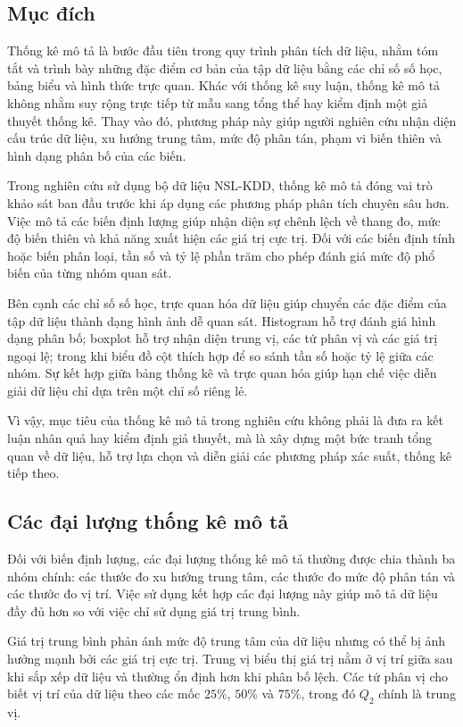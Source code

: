\documentclass[../main.tex]{subfiles}
\begin{document}
\subsection{Mục đích}

Thống kê mô tả là bước đầu tiên trong quy trình phân tích dữ liệu, nhằm tóm tắt và trình bày những đặc điểm cơ bản của tập dữ liệu bằng các chỉ số số học, bảng biểu và hình thức trực quan. Khác với thống kê suy luận, thống kê mô tả không nhằm suy rộng trực tiếp từ mẫu sang tổng thể hay kiểm định một giả thuyết thống kê. Thay vào đó, phương pháp này giúp người nghiên cứu nhận diện cấu trúc dữ liệu, xu hướng trung tâm, mức độ phân tán, phạm vi biến thiên và hình dạng phân bố của các biến.

Trong nghiên cứu sử dụng bộ dữ liệu NSL-KDD, thống kê mô tả đóng vai trò khảo sát ban đầu trước khi áp dụng các phương pháp phân tích chuyên sâu hơn. Việc mô tả các biến định lượng giúp nhận diện sự chênh lệch về thang đo, mức độ biến thiên và khả năng xuất hiện các giá trị cực trị. Đối với các biến định tính hoặc biến phân loại, tần số và tỷ lệ phần trăm cho phép đánh giá mức độ phổ biến của từng nhóm quan sát.

Bên cạnh các chỉ số số học, trực quan hóa dữ liệu giúp chuyển các đặc điểm của tập dữ liệu thành dạng hình ảnh dễ quan sát. Histogram hỗ trợ đánh giá hình dạng phân bố; boxplot hỗ trợ nhận diện trung vị, các tứ phân vị và các giá trị ngoại lệ; trong khi biểu đồ cột thích hợp để so sánh tần số hoặc tỷ lệ giữa các nhóm. Sự kết hợp giữa bảng thống kê và trực quan hóa giúp hạn chế việc diễn giải dữ liệu chỉ dựa trên một chỉ số riêng lẻ.

Vì vậy, mục tiêu của thống kê mô tả trong nghiên cứu không phải là đưa ra kết luận nhân quả hay kiểm định giả thuyết, mà là xây dựng một bức tranh tổng quan về dữ liệu, hỗ trợ lựa chọn và diễn giải các phương pháp xác suất, thống kê tiếp theo.

\subsection{Các đại lượng thống kê mô tả}

Đối với biến định lượng, các đại lượng thống kê mô tả thường được chia thành ba nhóm chính: các thước đo xu hướng trung tâm, các thước đo mức độ phân tán và các thước đo vị trí. Việc sử dụng kết hợp các đại lượng này giúp mô tả dữ liệu đầy đủ hơn so với việc chỉ sử dụng giá trị trung bình.

Giá trị trung bình phản ánh mức độ trung tâm của dữ liệu nhưng có thể bị ảnh hưởng mạnh bởi các giá trị cực trị. Trung vị biểu thị giá trị nằm ở vị trí giữa sau khi sắp xếp dữ liệu và thường ổn định hơn khi phân bố lệch. Các tứ phân vị cho biết vị trí của dữ liệu theo các mốc $25\%$, $50\%$ và $75\%$, trong đó $Q_2$ chính là trung vị.
\end{document}
